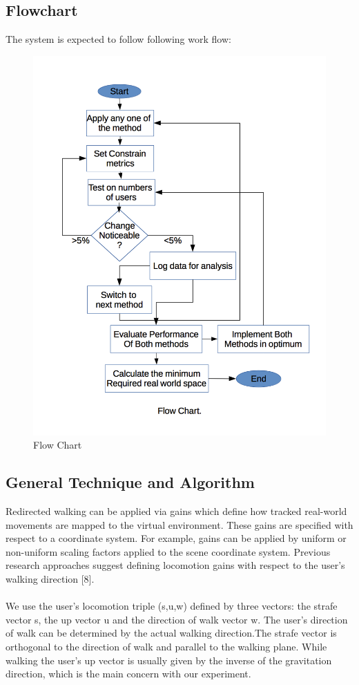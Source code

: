 \documentclass[12pt]{article}
\begin{document}
\subsection{Flowchart}
The system is expected to follow following work flow:
\begin{figure}[!ht]
\includegraphics[width = 0.8 \textwidth]{FlowChart}
\caption{Flow Chart}
\end{figure}

\clearpage
\subsection{General Technique and Algorithm}
Redirected walking can be applied via gains which define how tracked real-world movements are mapped to the virtual environment. These gains are specified with respect to a coordinate system. For example, gains can be applied by uniform or non-uniform scaling factors applied to the scene coordinate system. Previous research approaches suggest defining locomotion gains with respect to the user’s walking direction [8].\\
\\
We use the user’s locomotion triple (s,u,w) defined by three vectors: the strafe vector s, the up vector u and the direction of walk vector w. The user’s direction of walk can be determined by the actual walking direction.The strafe vector is orthogonal to the direction of walk and parallel to the walking plane. While walking the user’s up vector is usually given by the inverse of the gravitation direction, which is the main concern with our experiment.
\end{document}
